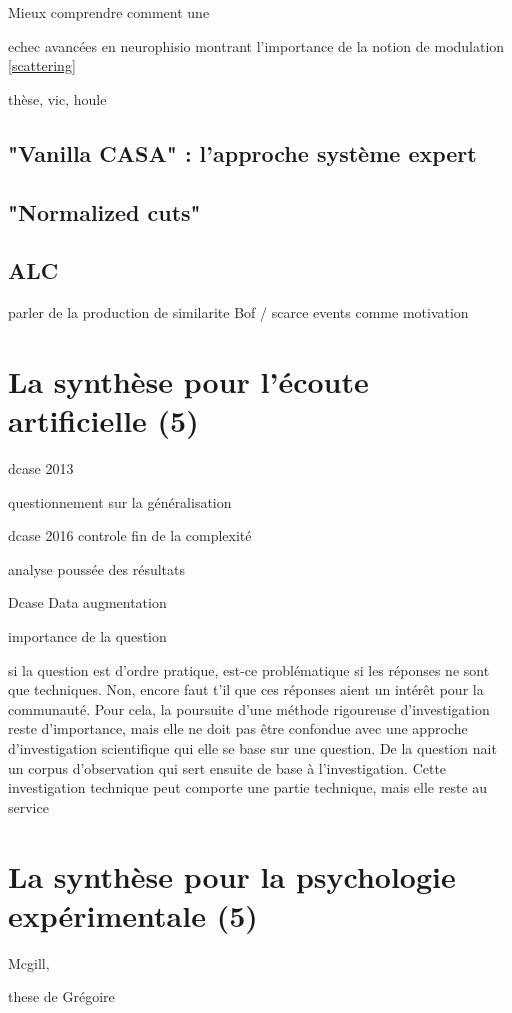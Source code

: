 Mieux comprendre comment une

echec
avancées en neurophisio montrant l'importance de la notion de modulation \ref{scattering}

thèse, vic, houle

\subsection{"Vanilla CASA" : l'approche système expert}

\subsection{"Normalized cuts"}

\cite{lagrangeTaslp08}

\subsection{ALC}

parler de la production de similarite Bof / scarce events comme motivation



\section{La synthèse pour l'écoute artificielle (5)}

dcase 2013 \cite{stowellhal-01253912}

questionnement sur la généralisation \cite{lafayhal-01111381}

dcase 2016 controle fin de la complexité

analyse poussée des résultats

Dcase  \cite{mesa} Data augmentation

importance de la question

si la question est d'ordre pratique, est-ce problématique si les réponses ne sont que techniques. Non, encore faut t'il que ces réponses aient un intérêt pour la communauté. Pour cela, la poursuite d'une méthode rigoureuse d'investigation reste d'importance, mais elle ne doit pas être confondue avec une approche d'investigation scientifique qui elle se base sur une question. De la question nait un corpus d'observation qui sert ensuite de base à l'investigation. Cette investigation technique peut comporte une partie technique, mais elle reste au service

\section{La synthèse pour la psychologie expérimentale (5)}

Mcgill, \cite{LagrangeTasslp10}

\cite{Murphy11a}

these de Grégoire \cite{lafayhal-01300399}
